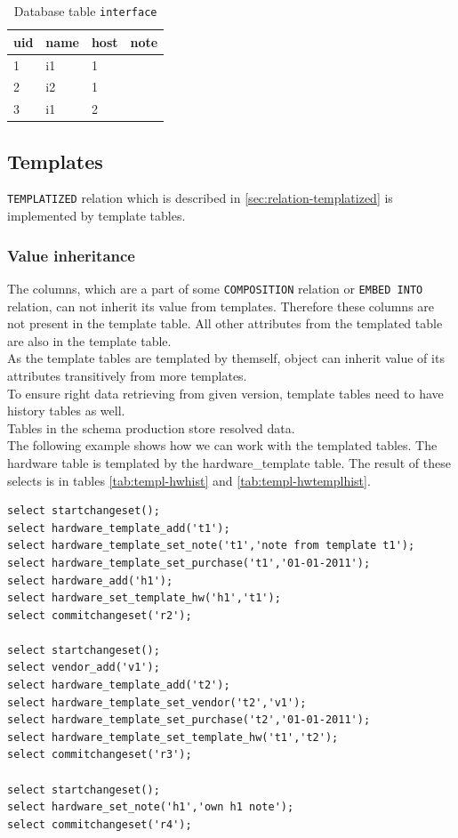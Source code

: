 \documentclass[deska]{subfiles}
\begin{document}
\begin{longtable}{ l | l | l | l }
    \caption{Database table {\tt interface}}
    \label{tab:embed-interface} \\
    uid & name & host & note\\
    \hline
    \endhead
    1 & i1 & 1 & \\
    2 & i2 & 1 & \\
    3 & i1 & 2 & \\
    \hline
\end{longtable}


\subsection{Templates}
{\tt TEMPLATIZED} relation which is described in \ref{sec:relation-templatized} is implemented by template tables. 

\subsubsection{Value inheritance}
The columns, which are a part of some {\tt COMPOSITION} relation or {\tt EMBED INTO} relation, can not inherit its value from templates. Therefore these columns are not present in the template table. All other attributes from the templated table are also in the template table.\\
As the template tables are templated by themself, object can inherit value of its attributes transitively from more templates.\\
To ensure right data retrieving from given version, template tables need to have history tables as well.\\
Tables in the schema production store resolved data.\\
The following example shows how we can work with the templated tables. The hardware table is templated by the hardware\_template table. The result of these selects is in tables \ref{tab:templ-hwhist} and \ref{tab:templ-hwtemplhist}.

\begin{verbatim}
select startchangeset();
select hardware_template_add('t1');
select hardware_template_set_note('t1','note from template t1');
select hardware_template_set_purchase('t1','01-01-2011');
select hardware_add('h1');
select hardware_set_template_hw('h1','t1');
select commitchangeset('r2');

select startchangeset();
select vendor_add('v1');
select hardware_template_add('t2');
select hardware_template_set_vendor('t2','v1');
select hardware_template_set_purchase('t2','01-01-2011');
select hardware_template_set_template_hw('t1','t2');
select commitchangeset('r3');

select startchangeset();
select hardware_set_note('h1','own h1 note');
select commitchangeset('r4');
\end{verbatim}
\end{document}
